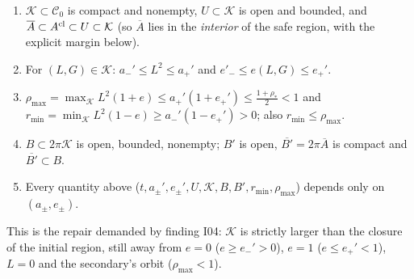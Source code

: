 \begin{lemma}\label{bpI:p8:safe-region}
\begin{enumerate}[label=(\alph*)]
\item $\mathcal K\subset\mathcal C_0$ is compact and nonempty, $U\subset\mathcal K$ is open and bounded, and $\overline A\subset A^{\rm cl}\subset U\subset\mathcal K$ (so $\overline A$ lies in the \emph{interior} of the safe region, with the explicit margin below).
\item For $(L,G)\in\mathcal K$: $a_-'\le L^2\le a_+'$ and $e'_-\le e(L,G)\le e_+'$.
\item $\rho_{\max}=\max_{\mathcal K}L^2(1+e)\le a_+'(1+e_+')\le\frac{1+\rho_*}2<1$ and $r_{\min}=\min_{\mathcal K}L^2(1-e)\ge a_-'(1-e_+')>0$; also $r_{\min}\le\rho_{\max}$.
\item $B\subset2\pi\mathcal K$ is open, bounded, nonempty; $B'$ is open, $\overline{B'}=2\pi\overline A$ is compact and $\overline{B'}\subset B$.
\item Every quantity above ($t,a_\pm',e_\pm',U,\mathcal K,B,B',r_{\min},\rho_{\max}$) depends only on $(a_\pm,e_\pm)$.
\end{enumerate}
This is the repair demanded by finding I04: $\mathcal K$ is strictly larger than the closure of the initial region, still away from $e=0$ ($e\ge e_-'>0$), $e=1$ ($e\le e_+'<1$), $L=0$ and the secondary's orbit ($\rho_{\max}<1$).
\end{lemma}

